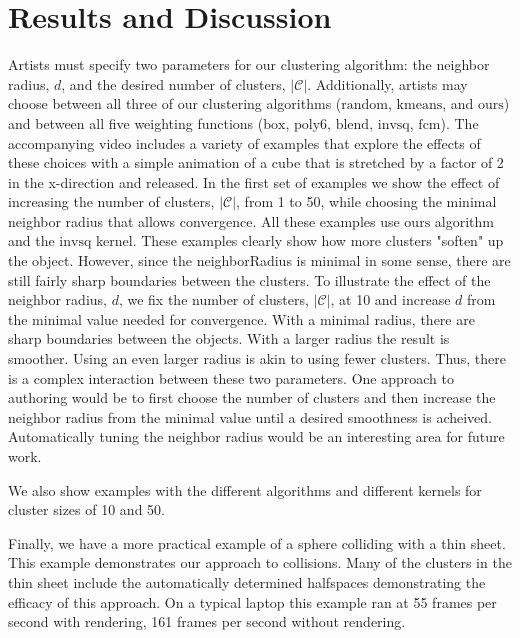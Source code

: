 \documentclass[review]{acmsiggraph}
\begin{document}
\section{Results and Discussion}
\label{sec:results}

Artists must specify two parameters for our clustering algorithm: the neighbor radius, $d$, and the desired number of clusters, 
$|\mathcal{C}|$.  Additionally, artists may choose between all three of our clustering algorithms ($\mathrm{random}$, $\mathrm{kmeans}$,
and $\mathrm{ours}$) and between all five weighting functions ($\mathrm{box}$, $\mathrm{poly6}$, $\mathrm{blend}$, $\mathrm{invsq}$, 
$\mathrm{fcm}$). The accompanying video includes a variety of examples that explore the effects of these choices with a simple animation
of a cube that is stretched by a factor of 2 in the x-direction and released.
In the first set of examples we show the effect of increasing the number of clusters, $|\mathcal{C}|$, from 1 to 50, while choosing the
minimal neighbor radius that allows convergence.  All these examples use $\mathrm{ours}$ algorithm and the $\mathrm{invsq}$ kernel.
These examples clearly show how more clusters "soften" up the object.  
However, since the neighborRadius is minimal in some sense, there are still fairly sharp boundaries between the clusters.
To illustrate the effect of the neighbor radius, $d$, we fix the number of clusters, $|\mathcal{C}|$, at 10 and increase $d$ from
the minimal value needed for convergence.  With a minimal radius, there are sharp boundaries between the objects.  With a larger
radius the result is smoother.  Using an even larger radius is akin to using fewer clusters.  Thus, there is a complex interaction
between these two parameters.  One approach to authoring would be to first choose the number of clusters and then increase the neighbor
radius from the minimal value until a desired smoothness is acheived.  Automatically tuning the neighbor radius would be an interesting
area for future work.

We also show examples with the different algorithms and different kernels for cluster sizes of 10 and 50.  

Finally, we have a more practical example of a sphere colliding with a thin sheet.  This example demonstrates our approach
to collisions.  Many of the clusters in the thin sheet include the automatically determined halfspaces demonstrating the efficacy
of this approach.  On a typical laptop this example ran at 55 frames per second with rendering, 161 frames per second without rendering.
\end{document}
